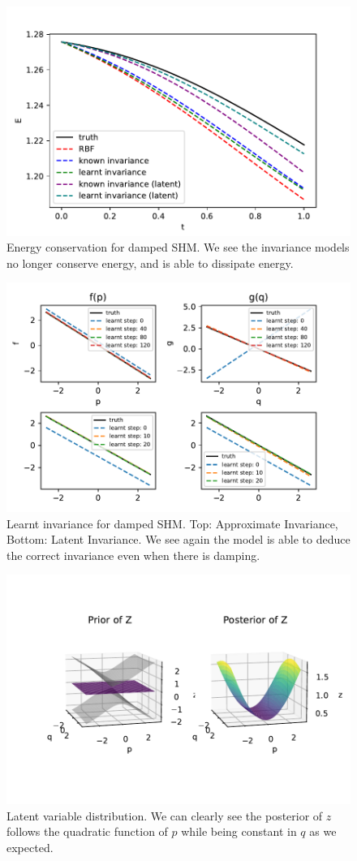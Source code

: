 \documentclass{statsmsc}
\begin{document}
\begin{figure}[H] 
  \includegraphics[width=0.8\linewidth]{../codes/figures/damped_shm_energy.pdf}
  \centering
  \caption{Energy conservation for damped SHM. We see the invariance models no longer conserve energy, and is able to dissipate energy.}
  \label{fig:damped_shm_energy}
\end{figure}


\begin{figure}[H] 
  \includegraphics[width=0.8\linewidth]{../codes/figures/damped_shm_learnt_over_time.pdf}
  \centering
  \caption{Learnt invariance for damped SHM. Top: Approximate Invariance, Bottom: Latent Invariance. We see again the model is able to deduce the correct invariance even when there is damping.}
  \label{fig:damped_shm_learnt}
\end{figure}

\begin{figure}[H] 
  \includegraphics[width=0.8\linewidth]{../codes/figures/latent_damped_shm.pdf}
  \centering
  \caption{Latent variable distribution. We can clearly see the posterior of $z$ follows the quadratic function of $p$ while being constant in $q$ as we expected.}
  \label{fig:latent_damped_shm}
\end{figure}
\end{document}
